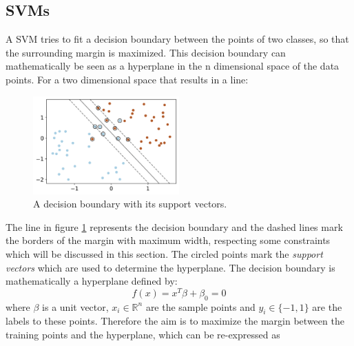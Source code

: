 \subsection{\acl{SVM}s}
A \ac{SVM} tries to fit a decision boundary between the points of two classes, so that the surrounding margin is maximized.
This decision boundary can mathematically be seen as a hyperplane in the n dimensional space of the data points.
For a two dimensional space that results in a line:
\begin{figure}[h]
    \centering
    \includegraphics[width=0.5\textwidth]{figures/svm_decision_boundary.png}
    \caption{A decision boundary with its support vectors.\protect\footnotemark}
    \label{figure:svm_decision_boundary}
\end{figure}
The line in figure \ref{figure:svm_decision_boundary} represents the decision boundary and the dashed lines mark the borders of the margin with maximum width, respecting some constraints which will be discussed in this section.
The circled points mark the \textit{support vectors} which are used to determine the hyperplane.
The decision boundary is mathematically a hyperplane defined by:
\begin{equation}
    f(x)=x^T\beta + \beta_0=0
    \label{equation:svm_hyperplane}
\end{equation}
where $\beta$ is a unit vector, $x_i \in \mathbb{R}^n$ are the sample points and $y_i \in \{-1, 1\}$ are the labels to these points.
Therefore the aim is to maximize the margin between the training points and the hyperplane, which can be re-expressed as
